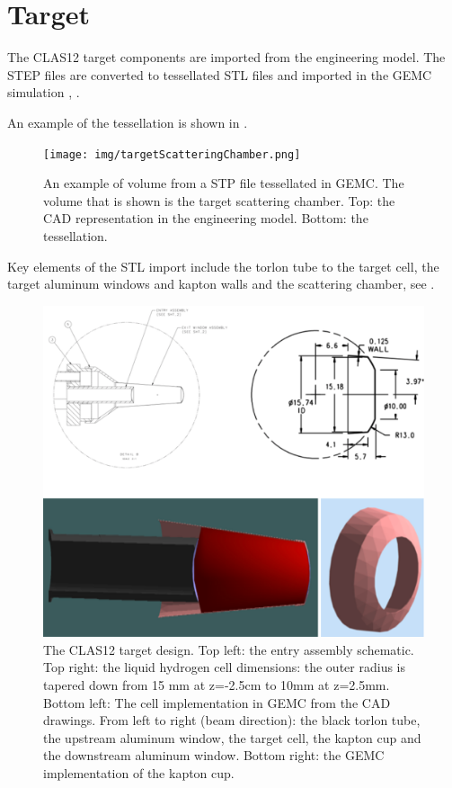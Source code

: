 \section{Target}

The CLAS12 target components are imported from the engineering model. The STEP files are converted to tessellated STL files and imported
in the GEMC simulation \cite{targetCorrection}, \cite{targetStudy}.

An example of the tessellation is shown in .

\begin{figure}
	\centering
	\texttt{[image: img/targetScatteringChamber.png]}
	\caption{An example of volume from a STP file tessellated in GEMC. The volume that is shown is the target scattering chamber.
            Top: the CAD representation in the engineering model. Bottom: the tessellation. }
	\label{fig:targetScatteringChamber}
\end{figure}

Key elements of the STL import include the torlon tube to the target cell,
the target aluminum windows and kapton walls and the scattering chamber, see .

\begin{figure}
	\centering
	\includegraphics[width=0.95\columnwidth,keepaspectratio]{img/targetDesign.png}
	\caption{The CLAS12 target design. Top left: the entry assembly schematic. Top right: the liquid hydrogen cell
            dimensions: the outer radius is tapered down from 15 mm at z=-2.5cm to 10mm at z=2.5mm.
            Bottom left: The cell implementation in GEMC from the CAD drawings. From left to right (beam direction):
            the black torlon tube, the upstream aluminum window, the target cell, the kapton cup and the
				downstream aluminum window. Bottom right: the GEMC implementation of the kapton cup.}
	\label{fig:targetDesign}
\end{figure}

